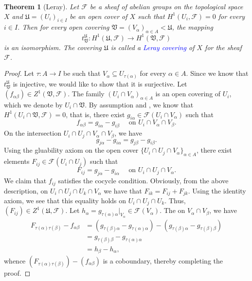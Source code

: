 \documentclass[12pt]{article}
\theoremstyle{thmstyle}
\newtheorem{theorem}{Theorem}[section]
\theoremstyle{defstyle}
\newcommand{\frakU}{\mathfrak{U}}
\newcommand{\frakV}{\mathfrak{V}}
\newcommand{\scrF}{\mathscr F}
\newcommand{\define}[1]{\textcolor{blue}{\textit{#1}}}
\begin{document}
\begin{theorem}[Leray]
    Let $\scrF$ be a sheaf of abelian groups on the topological space $X$ and $\frakU = (U_i)_{i\in I}$ be an open cover of $X$ such that $H^1(U_i,\scrF) = 0$ for every $i\in I$. Then for every open covering $\frakV = (V_\alpha)_{\alpha\in A} < \frakU$, the mapping 
    \begin{equation*}
        t^{\frakU}_{\frakV} : H^1(\frakU,\scrF)\to H^1(\frakV,\scrF)
    \end{equation*}
    is an isomorphism. The covering $\frakU$ is called a \define{Leray covering} of $X$ for the sheaf $\scrF$.
\end{theorem}
\begin{proof}
    Let $\tau: A\to I$ be such that $V_\alpha\subseteq U_{\tau(\alpha)}$ for every $\alpha\in A$. Since we know that $t^{\frakU}_{\frakV}$ is injective, we would like to show that it is surjective. Let $(f_{\alpha\beta})\in Z^1(\frakV,\scrF)$. The family $(U_i\cap V_\alpha)_{\alpha\in A}$ is an open covering of $U_i$, which we denote by $U_i\cap\frakV$. By assumption and , we know that $H^1(U_i\cap\frakV,\scrF) = 0$, that is, there exist $g_{i\alpha}\in\scrF(U_i\cap V_\alpha)$ such that 
    \begin{equation*}
        f_{\alpha\beta} = g_{i\alpha} - g_{i\beta}\quad\text{ on } U_i\cap V_\alpha\cap V_\beta.
    \end{equation*}
    On the intersection $U_i\cap U_j\cap V_\alpha\cap V_\beta$, we have 
    \begin{equation*}
        g_{j\alpha} - g_{i\alpha} = g_{j\beta} - g_{i\beta}.
    \end{equation*}
    Using the gluability axiom on the open cover $\{U_i\cap U_j\cap V_\alpha\}_{\alpha\in A}$, there exist elements $F_{ij}\in\scrF(U_i\cap U_j)$ such that 
    \begin{equation*}
        F_{ij} = g_{j\alpha} - g_{i\alpha}\quad\text{ on } U_i\cap U_j\cap V_\alpha.
    \end{equation*}
    We claim that $f_{ij}$ satisfies the cocycle condition. Obviously, from the above description, on $U_i\cap U_j\cap U_k\cap V_\alpha$ we have that $F_{ik} = F_{ij} + F_{jk}$. Using the identity axiom, we see that this equality holds on $U_i\cap U_j\cap U_k$. Thus, $(F_{ij})\in Z^1(\frakU,\scrF)$. Let $h_\alpha = g_{\tau(\alpha)\alpha}|_{V_\alpha}\in\scrF(V_\alpha)$. The on $V_\alpha\cap V_\beta$, we have 
    \begin{align*}
        F_{\tau(\alpha)\tau(\beta)} - f_{\alpha\beta} &= \left(g_{\tau(\beta)\alpha} - g_{\tau(\alpha)\alpha}\right) - \left(g_{\tau(\beta)\alpha} - g_{\tau(\beta)\beta}\right)\\
        &= g_{\tau(\beta)\beta} - g_{\tau(\alpha)\alpha}\\
        &= h_\beta - h_\alpha,
    \end{align*}
    whence $(F_{\tau(\alpha)\tau(\beta)}) - (f_{\alpha\beta})$ is a coboundary, thereby completing the proof.
\end{proof}
\end{document}
